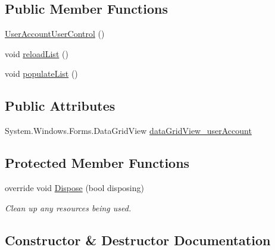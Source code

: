 \subsection*{Public Member Functions}
\begin{DoxyCompactItemize}
\item 
\hyperlink{class_health___assignment_1_1_user_account_user_control_a85ea6309bbcf56bca7441771b9e48af0}{User\+Account\+User\+Control} ()
\item 
void \hyperlink{class_health___assignment_1_1_user_account_user_control_a7ba0eeb079f6d61a6f22c5b1a73b2db9}{reload\+List} ()
\item 
void \hyperlink{class_health___assignment_1_1_user_account_user_control_adf05cf68363451d3aae9a3fc99927cef}{populate\+List} ()
\end{DoxyCompactItemize}
\subsection*{Public Attributes}
\begin{DoxyCompactItemize}
\item 
System.\+Windows.\+Forms.\+Data\+Grid\+View \hyperlink{class_health___assignment_1_1_user_account_user_control_a263ab00c50387caf053eac8d77310872}{data\+Grid\+View\+\_\+user\+Account}
\end{DoxyCompactItemize}
\subsection*{Protected Member Functions}
\begin{DoxyCompactItemize}
\item 
override void \hyperlink{class_health___assignment_1_1_user_account_user_control_ae03dea28845a4940e182af9f01b8cce1}{Dispose} (bool disposing)
\begin{DoxyCompactList}\small\item\em Clean up any resources being used. \end{DoxyCompactList}\end{DoxyCompactItemize}


\subsection{Constructor \& Destructor Documentation}
\mbox{\label{class_health___assignment_1_1_user_account_user_control_a85ea6309bbcf56bca7441771b9e48af0}} 
